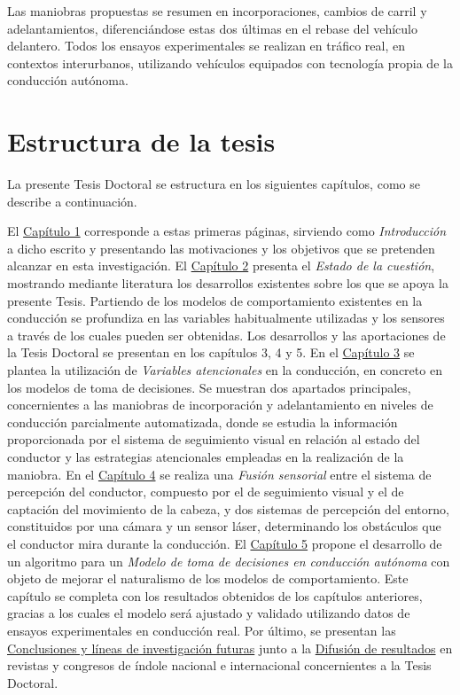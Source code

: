 Las maniobras propuestas se resumen en incorporaciones, cambios de carril y adelantamientos, diferenciándose estas dos últimas en el rebase del vehículo delantero. Todos los ensayos experimentales se realizan en tráfico real, en contextos interurbanos, utilizando vehículos equipados con tecnología propia de la conducción autónoma. 

\section{Estructura de la tesis}

La presente Tesis Doctoral se estructura en los siguientes capítulos, como se describe a continuación.

El \hyperref[ch1]{Capítulo 1} corresponde a estas primeras páginas, sirviendo como \emph{Introducción} a dicho escrito y presentando las motivaciones y los objetivos que se pretenden alcanzar en esta investigación.
El \hyperref[ch2]{Capítulo 2} presenta el \emph{Estado de la cuestión}, mostrando mediante literatura los desarrollos existentes sobre los que se apoya la presente Tesis. Partiendo de los modelos de comportamiento existentes en la conducción se profundiza en las variables habitualmente utilizadas y los sensores a través de los cuales pueden ser obtenidas. Los desarrollos y las aportaciones de la Tesis Doctoral se presentan en los capítulos 3, 4 y 5. 
En el \hyperref[ch3]{Capítulo 3} se plantea la utilización de \emph{Variables atencionales} en la conducción, en concreto en los modelos de toma de decisiones. Se muestran dos apartados principales, concernientes a las maniobras de incorporación y adelantamiento en niveles de conducción parcialmente automatizada, donde se estudia la información proporcionada por el sistema de seguimiento visual en relación al estado del conductor y las estrategias atencionales empleadas en la realización de la maniobra. 
En el \hyperref[ch4]{Capítulo 4} se realiza una \emph{Fusión sensorial} entre el sistema de percepción del conductor, compuesto por el de seguimiento visual y el de captación del movimiento de la cabeza, y dos sistemas de percepción del entorno, constituidos por una cámara y un sensor láser, determinando los obstáculos que el conductor mira durante la conducción. 
El \hyperref[ch5]{Capítulo 5} propone el desarrollo de un algoritmo para un \emph{Modelo de toma de decisiones en conducción autónoma} con objeto de mejorar el naturalismo de los modelos de comportamiento. Este capítulo se completa con los resultados obtenidos de los capítulos anteriores, gracias a los cuales el modelo será ajustado y validado utilizando datos de ensayos experimentales en conducción real.
Por último, se presentan las \hyperref[ch6]{Conclusiones y líneas de investigación futuras} junto a la \hyperref[ch7]{Difusión de resultados} en revistas y congresos de índole nacional e internacional concernientes a la Tesis Doctoral. 

